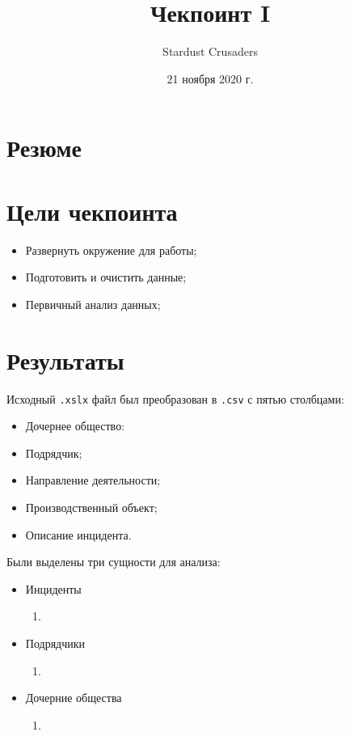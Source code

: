 \documentclass{article}
\title{Чекпоинт I}
\author{Stardust Crusaders}
\date{21 ноября 2020 г.}
\begin{document}
\maketitle
\tableofcontents

\section*{Резюме}

\newpage
\section{Цели чекпоинта}
\begin{itemize}
    \item Развернуть окружение для работы;
    \item Подготовить и очистить данные;
    \item Первичный анализ данных;
\end{itemize}


\section{Результаты}
Исходный \texttt{.xslx} файл был преобразован в \texttt{.csv} с пятью столбцами: 
\begin{itemize}
    \item Дочернее общество:
    \item Подрядчик; 
    \item Направление деятельности;
    \item Производственный объект;
    \item Описание инцидента.
\end{itemize}

Были выделены три сущности для анализа:
\begin{itemize}
    \item Инциденты
    \begin{enumerate}[label=(\arabic*)]
        \item 
    \end{enumerate}
    \item Подрядчики
    \begin{enumerate}[label=(\arabic*)]
        \item 
    \end{enumerate}
    \item Дочерние общества
    \begin{enumerate}[label=(\arabic*)]
        \item 
    \end{enumerate}
\end{itemize}
\end{document}
